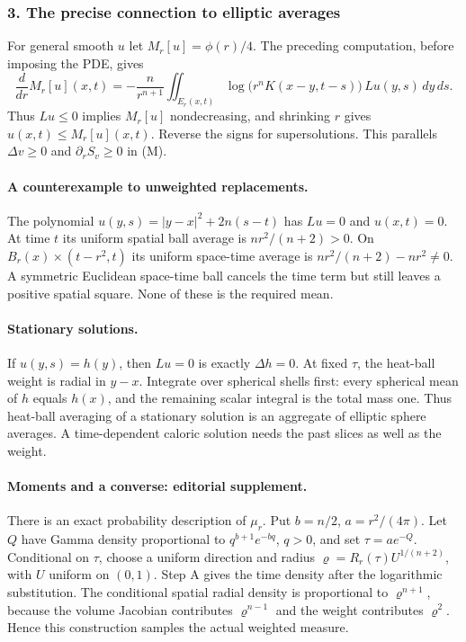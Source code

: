 \Needspace{45mm}

\subsubsection*{3. The precise connection to elliptic averages}
For general smooth $u$ let $M_r[u]=\phi(r)/4$.
The preceding computation, before imposing the PDE, gives
\[
 \frac d{dr}M_r[u](x,t)
 =-\frac n{r^{n+1}}\iint_{E_r(x,t)}
 \log\big(r^nK(x-y,t-s)\big)\,Lu(y,s)\,dy\,ds.
 \tag{HR}
\]
Thus $Lu\leq0$ implies $M_r[u]$ nondecreasing, and shrinking $r$ gives
$u(x,t)\leq M_r[u](x,t)$. Reverse the signs for supersolutions.
This parallels $\Delta v\geq0$ and $\partial_rS_v\geq0$ in (M).
\Needspace{45mm}

\paragraph{A counterexample to unweighted replacements.}
The polynomial $u(y,s)=|y-x|^2+2n(s-t)$ has $Lu=0$ and $u(x,t)=0$.
At time $t$ its uniform spatial ball average is $nr^2/(n+2)>0$.
On $B_r(x)\times(t-r^2,t)$ its uniform space-time average is
$nr^2/(n+2)-nr^2\ne0$.
A symmetric Euclidean space-time ball cancels the time term but still
leaves a positive spatial square. None of these is the required mean.
\Needspace{45mm}

\paragraph{Stationary solutions.}
If $u(y,s)=h(y)$, then $Lu=0$ is exactly $\Delta h=0$.
At fixed $\tau$, the heat-ball weight is radial in $y-x$.
Integrate over spherical shells first: every spherical mean of $h$
equals $h(x)$, and the remaining scalar integral is the total mass one.
Thus heat-ball averaging of a stationary solution is an aggregate of
elliptic sphere averages. A time-dependent caloric solution needs the
past slices as well as the weight.

\paragraph{Moments and a converse: editorial supplement.}
There is an exact probability description of $\mu_r$.
Put $b=n/2$, $a=r^2/(4\pi)$.
Let $Q$ have Gamma density proportional to $q^{b+1}e^{-bq}$, $q>0$,
and set $\tau=ae^{-Q}$.
Conditional on $\tau$, choose a uniform direction and radius
$\varrho=R_r(\tau)U^{1/(n+2)}$, with $U$ uniform on $(0,1)$.
Step A gives the time density after the logarithmic substitution.
The conditional spatial radial density is proportional to
$\varrho^{n+1}$, because the volume Jacobian contributes
$\varrho^{n-1}$ and the weight contributes $\varrho^2$.
Hence this construction samples the actual weighted measure.

